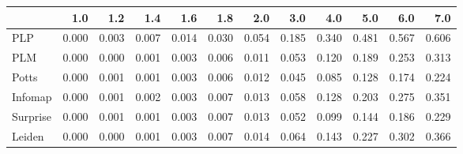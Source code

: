 \begin{tabular}{lrrrrrrrrrrr}
\toprule
{} &   1.0 &   1.2 &   1.4 &   1.6 &   1.8 &   2.0 &   3.0 &   4.0 &   5.0 &   6.0 &   7.0 \\
\midrule
PLP      & 0.000 & 0.003 & 0.007 & 0.014 & 0.030 & 0.054 & 0.185 & 0.340 & 0.481 & 0.567 & 0.606 \\
PLM      & 0.000 & 0.000 & 0.001 & 0.003 & 0.006 & 0.011 & 0.053 & 0.120 & 0.189 & 0.253 & 0.313 \\
Potts    & 0.000 & 0.001 & 0.001 & 0.003 & 0.006 & 0.012 & 0.045 & 0.085 & 0.128 & 0.174 & 0.224 \\
Infomap  & 0.000 & 0.001 & 0.002 & 0.003 & 0.007 & 0.013 & 0.058 & 0.128 & 0.203 & 0.275 & 0.351 \\
Surprise & 0.000 & 0.001 & 0.001 & 0.003 & 0.007 & 0.013 & 0.052 & 0.099 & 0.144 & 0.186 & 0.229 \\
Leiden   & 0.000 & 0.000 & 0.001 & 0.003 & 0.007 & 0.014 & 0.064 & 0.143 & 0.227 & 0.302 & 0.366 \\
\bottomrule
\end{tabular}
